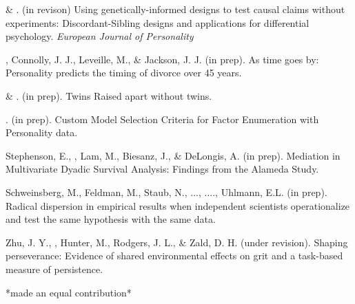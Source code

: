 
\item \meb \& \joe. (in revison) Using genetically-informed designs to test causal claims without experiments: Discordant-Sibling designs and applications for differential psychology. \textit{European Journal of Personality}  \href{https://osf.io/zpdwt/}{\color{blue}{https://osf.io/zpdwt/}}
\item\meb, Connolly, J. J., Leveille, M., \& Jackson, J. J. (in prep). As time goes by: Personality predicts the timing of divorce over 45 years.%
\item \meb \& \joe.  (in prep). Twins Raised apart without twins.
\item \meb. (in prep). Custom Model Selection Criteria for Factor Enumeration with Personality data.
\item Stephenson, E., \meb, Lam, M., Biesanz, J., \& DeLongis, A. (in prep). Mediation in Multivariate Dyadic Survival Analysis: Findings from the Alameda Study. %
\item Schweinsberg, M., Feldman, M., Staub, N., ..., \meb ...., Uhlmann, E.L. (in prep). Radical dispersion in empirical results when independent scientists operationalize and test the same hypothesis with the same data. 
\item Zhu, J. Y., \meb, Hunter, M., Rodgers, J. L., \& Zald, D. H. (under revision). Shaping perseverance: Evidence of shared environmental effects on grit and a task-based measure of persistence. %
\vspace{-2mm}\begin{center}\footnotesize{*made an equal contribution*}\end{center} \vspace{-3mm}
\vspace{-2mm}\begin{center}\end{center} \vspace{-4mm}
